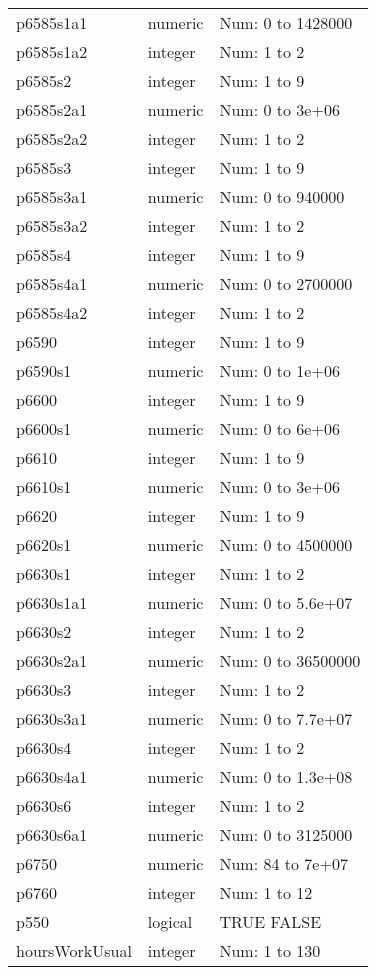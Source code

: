 \begin{table}[!htbp]
\begin{tabular}{p{}p{}p{}}
p6585s1a1 & numeric & Num: 0 to 1428000 \\ 
p6585s1a2 & integer & Num: 1 to 2 \\ 
p6585s2 & integer & Num: 1 to 9 \\ 
p6585s2a1 & numeric & Num: 0 to 3e+06 \\ 
p6585s2a2 & integer & Num: 1 to 2 \\ 
p6585s3 & integer & Num: 1 to 9 \\ 
p6585s3a1 & numeric & Num: 0 to 940000 \\ 
p6585s3a2 & integer & Num: 1 to 2 \\ 
p6585s4 & integer & Num: 1 to 9 \\ 
p6585s4a1 & numeric & Num: 0 to 2700000 \\ 
p6585s4a2 & integer & Num: 1 to 2 \\ 
p6590 & integer & Num: 1 to 9 \\ 
p6590s1 & numeric & Num: 0 to 1e+06 \\ 
p6600 & integer & Num: 1 to 9 \\ 
p6600s1 & numeric & Num: 0 to 6e+06 \\ 
p6610 & integer & Num: 1 to 9 \\ 
p6610s1 & numeric & Num: 0 to 3e+06 \\ 
p6620 & integer & Num: 1 to 9 \\ 
p6620s1 & numeric & Num: 0 to 4500000 \\ 
p6630s1 & integer & Num: 1 to 2 \\ 
p6630s1a1 & numeric & Num: 0 to 5.6e+07 \\ 
p6630s2 & integer & Num: 1 to 2 \\ 
p6630s2a1 & numeric & Num: 0 to 36500000 \\ 
p6630s3 & integer & Num: 1 to 2 \\ 
p6630s3a1 & numeric & Num: 0 to 7.7e+07 \\ 
p6630s4 & integer & Num: 1 to 2 \\ 
p6630s4a1 & numeric & Num: 0 to 1.3e+08 \\ 
p6630s6 & integer & Num: 1 to 2 \\ 
p6630s6a1 & numeric & Num: 0 to 3125000 \\ 
p6750 & numeric & Num: 84 to 7e+07 \\ 
p6760 & integer & Num: 1 to 12 \\ 
p550 & logical & TRUE FALSE \\ 
hoursWorkUsual & integer & Num: 1 to 130 \\ 

\end{tabular}
\end{table}
